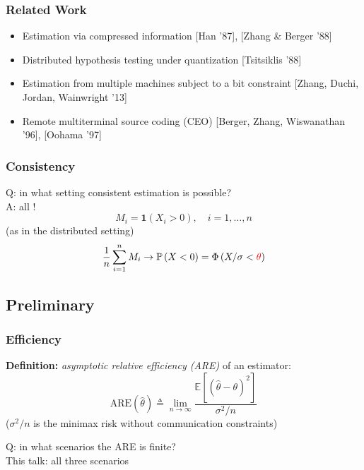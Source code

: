 \documentclass[mathserif]{beamer}
\newcommand{\thetac}{{\color{red} \theta}}
\newcommand{\Prob}{\mathbb{P}}
\begin{document}
\begin{frame}
\frametitle{Related Work}
\begin{itemize} 
\item Estimation via compressed information [Han '87], [Zhang \& Berger '88]
\item Distributed hypothesis testing under quantization [Tsitsiklis '88]
\item Estimation from multiple machines subject to a bit constraint [Zhang, Duchi, Jordan, Wainwright '13]
\item Remote multiterminal source coding (CEO) [Berger, Zhang, Wiswanathan '96], [Oohama '97]
\end{itemize}
\end{frame}

\begin{frame}
\frametitle{Consistency}
Q: in what setting consistent estimation is possible? \\
\bigskip
\pause
A: all !
\[
M_i = \mathbf 1(X_i>0),\quad i=1,\ldots,n
\]
(as in the distributed setting)
\[
\frac{1}{n}\sum_{i=1}^n M_i \rightarrow \Prob\left(X<0 \right) = \Phi\left(X/\sigma<\thetac\right)
\]
\end{frame}

\subsection{Preliminary}

\begin{frame}
\frametitle{Efficiency}
\textbf{Definition:} \emph{asymptotic relative efficiency (ARE)} of an estimator:
\[
\mathrm{ARE}(\widehat{\theta}) \triangleq \lim_{n\rightarrow \infty} \frac{\mathbb E \left[ \left(\widehat{\theta}-\theta \right)^2 \right]}{\sigma^2 / n}
\]
($\sigma^2/n$ is the minimax risk without communication constraints)

\bigskip
\pause
Q: in what scenarios the ARE is finite? \\
\bigskip
\pause
This talk: all three scenarios

\end{frame}
\end{document}
